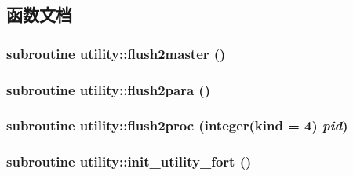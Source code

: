 \subsection{函数文档}
\hypertarget{namespaceutility_a9253f21bd4ce5431fc25424cf9784dd2}{
\subsubsection[{flush2master}]{\setlength{\rightskip}{0pt plus 5cm}subroutine utility::flush2master ()}}
\label{namespaceutility_a9253f21bd4ce5431fc25424cf9784dd2}
\hypertarget{namespaceutility_a923d7c8623e057e6cfda701520ce279d}{
\subsubsection[{flush2para}]{\setlength{\rightskip}{0pt plus 5cm}subroutine utility::flush2para ()}}
\label{namespaceutility_a923d7c8623e057e6cfda701520ce279d}
\hypertarget{namespaceutility_af89f3f402d624699dfad6c027d71d0cd}{
\subsubsection[{flush2proc}]{\setlength{\rightskip}{0pt plus 5cm}subroutine utility::flush2proc (integer(kind = 4) {\em pid})}}
\label{namespaceutility_af89f3f402d624699dfad6c027d71d0cd}
\hypertarget{namespaceutility_aa465c4557a921fb97082d392421be1e7}{
\subsubsection[{init\_\-utility\_\-fort}]{\setlength{\rightskip}{0pt plus 5cm}subroutine utility::init\_\-utility\_\-fort ()}}
\label{namespaceutility_aa465c4557a921fb97082d392421be1e7}



